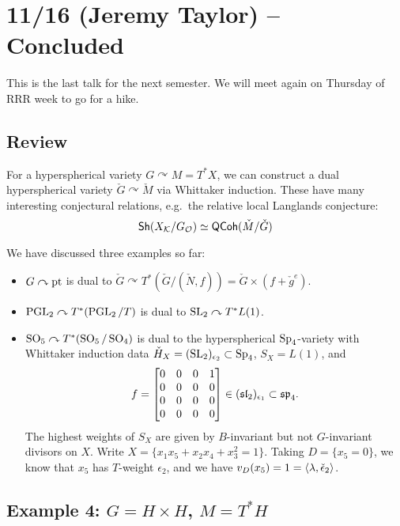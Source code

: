 \documentclass{article}
\begin{document}
\section{11/16 (Jeremy Taylor) -- Concluded}

This is the last talk for the next semester.
We will meet again on Thursday of RRR week to go for a hike.

\subsection{Review}

For a hyperspherical variety $G \curvearrowright M = T^*X$, we can construct a dual hyperspherical variety $\check{G} \curvearrowright \check{M}$ via Whittaker induction.
These have many interesting conjectural relations, e.g.\ the relative local Langlands conjecture:
\[
	\mathsf{Sh}(X_{\mathcal{K}} / G_{\mathcal{O}}) \simeq \mathsf{QCoh}(\check{M} / \check{G})
\]

We have discussed three examples so far:
\begin{itemize}
	\item $G \curvearrowright \operatorname{pt}$ is dual to $\check{G} \curvearrowright T^*(\check{G} / (\check{N},f)) = \check{G} \times (f + \check{g}^e)$.
	\item $\operatorname{PGL}_2 \curvearrowright T^*(\operatorname{PGL}_2 / T)$ is dual to $\operatorname{SL}_2 \curvearrowright T^* L(1)$.
	\item $\operatorname{SO}_5 \curvearrowright T^*(\operatorname{SO}_5 / \operatorname{SO}_4)$ is dual to the hyperspherical $\operatorname{Sp}_4$-variety with Whittaker induction data $\check{H}_X = (\operatorname{SL}_2)_{\epsilon_2} \subset \operatorname{Sp}_4$, $S_X = L(1)$, and
		\[
			f = \begin{bmatrix}
				0 & 0 & 0 & 1 \\
				0 & 0 & 0 & 0 \\
				0 & 0 & 0 & 0 \\
				0 & 0 & 0 & 0 \\
			\end{bmatrix} \in (\mathfrak{sl}_2)_{\epsilon_1} \subset \mathfrak{sp}_4.
		\]
		The highest weights of $S_X$ are given by $B$-invariant but not $G$-invariant divisors on $X$.
		Write $X = \{ x_1 x_5 + x_2 x_4 + x_3^2 = 1 \}$.
		Taking $D = \{ x_5 = 0 \}$, we know that $x_5$ has $T$-weight $\epsilon_2$, and we have $v_D(x_5) = 1 = \left\langle \lambda, \check{\epsilon}_2 \right\rangle$.
\end{itemize}

\subsection{Example 4: $G = H \times H$, $M = T^*H$}
\end{document}

